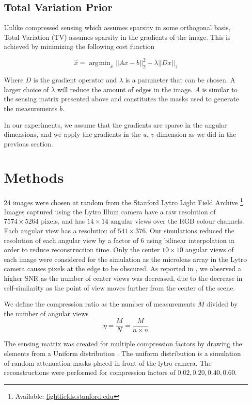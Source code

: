 \documentclass[10pt,twocolumn,letterpaper]{article}
\DeclareMathOperator*{\argmin}{\arg\!\min}
\begin{document}
\subsection{Total Variation Prior}

Unlike compressed sensing which assumes sparsity in some orthogonal basis, Total Variation (TV) assumes sparsity in the gradients of the image. This is achieved by minimizing the following cost function

\[ \hat{x} = \argmin_x ||Ax - b||^2_2 + \lambda ||D x||_1 \]

Where $D$ is the gradient operator and $\lambda$ is a parameter that can be chosen. A larger choice of $\lambda$ will reduce the amount of edges in the image. $A$ is similar to the sensing matrix presented above and constitutes the masks used to generate the measurements $b$.

In our experiments, we assume that the gradients are sparse in the angular dimensions, and we apply the gradients in the $u$, $v$ dimension as we did in the previous section.

\section{Methods}

24 images were chosen at random from the Stanford Lytro Light Field Archive \footnote{Available: \url{lightfields.stanford.edu}}. Images captured using the Lytro Illum camera have a raw resolution of $7574 \times 5264$ pixels, and has $14 \times 14$ angular views over the RGB colour channels. Each angular view has a resolution of $541 \times 376$. Our simulations reduced the resolution of each angular view by a factor of $6$ using bilinear interpolation in order to reduce reconstruction time. Only the center $10 \times 10$ angular views of each image were considered for the simulation as the microlens array in the Lytro camera causes pixels at the edge to be obscured. As reported in \cite{mainP1}, we observed a higher SNR as the number of center views was decreased, due to the decrease in self-similarity as the point of view moves further from the center of the scene.


We define the compression ratio as the number of measurements $M$ divided by the number of angular views \[ \eta = \frac{M}{N} = \frac{M}{n \times n}\]

The sensing matrix was created for multiple compression factors by drawing the elements from a Uniform distribution \cite{Rauhut11}. The uniform distribution is a simulation of random attenuation masks placed in front of the lytro camera. The reconstructions were performed for compression factors of $0.02, 0.20, 0.40, 0.60$.
\end{document}
